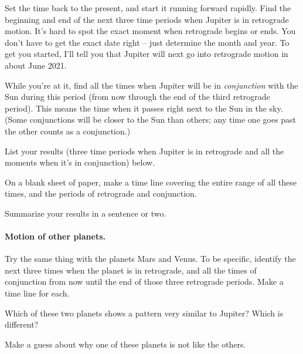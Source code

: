 Set the time back to the present, and start it running forward
rapidly. Find the beginning and end of the next three time periods
when Jupiter is in retrograde motion. It's hard to spot the
exact moment when retrograde begins or ends. You don't
have to get the exact date right -- just determine the month and
year. To get you started, I'll tell you that Jupiter will
next go into retrograde motion in about June 2021.


While you're at it, find all the times 
when Jupiter will be
in \textit{conjunction} with the Sun during this period (from
now through the end of the third retrograde period). 
This means the time when
it passes right next to the Sun in the sky. (Some conjunctions will be closer
to the Sun than others; any time one goes past the other counts as a
conjunction.)

List your results (three time periods when Jupiter is in retrograde
and all the moments when it's in conjunction) below.

\answerspace{3in}

On a blank sheet of paper, make a time line covering the entire
range of all these times, and the periods of retrograde and conjunction.

Summarize your results in a sentence or two.

\answerspace{1in}

\paragraph{Motion of other planets.}
Try the same thing with the planets Mars and Venus.
To be specific, identify the next three times when the planet is 
in retrograde, and all the times of conjunction from now until the end of those
three
retrograde periods. Make a time line for each.

\answerspace{5in}

Which of these two planets shows a pattern very similar to Jupiter?
Which is different?

\answerspace{1in}

Make a guess about why one of these planets is not like the others.

\answerspace{1in}



